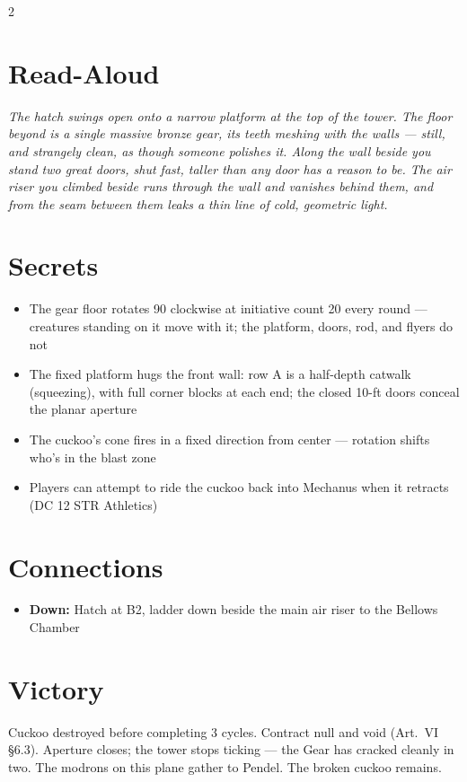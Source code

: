 \documentclass[10pt,letterpaper]{article}
\begin{document}
\begin{multicols}{2}

\section*{Read-Aloud}
\begin{readaloud}
\itshape
The hatch swings open onto a narrow platform at the top of the tower. The floor beyond is a single massive bronze gear, its teeth meshing with the walls --- still, and strangely clean, as though someone polishes it. Along the wall beside you stand two great doors, shut fast, taller than any door has a reason to be. The air riser you climbed beside runs through the wall and vanishes behind them, and from the seam between them leaks a thin line of cold, geometric light.
\end{readaloud}

\section*{Secrets}
\begin{itemize}
\item The gear floor rotates 90\textdegree{} clockwise at initiative count 20 every round --- creatures standing on it move with it; the platform, doors, rod, and flyers do not
\item The fixed platform hugs the front wall: row A is a half-depth catwalk (squeezing), with full corner blocks at each end; the closed 10-ft doors conceal the planar aperture
\item The cuckoo's cone fires in a fixed direction from center --- rotation shifts who's in the blast zone
\item Players can attempt to ride the cuckoo back into Mechanus when it retracts (DC 12 STR Athletics)
\end{itemize}

\section*{Connections}
\begin{itemize}
\item \textbf{Down:} Hatch at B2, ladder down beside the main air riser to the Bellows Chamber
\end{itemize}

\section*{Victory}
Cuckoo destroyed before completing 3 cycles. Contract null and void (Art.\ VI \S6.3). Aperture closes; the tower stops ticking --- the Gear has cracked cleanly in two. The modrons on this plane gather to Pendel. The broken cuckoo remains.


\end{multicols}
\end{document}
